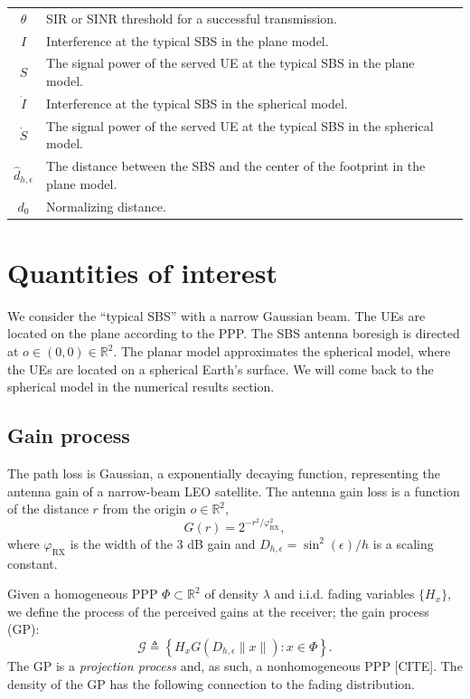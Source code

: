 \documentclass[lettersize,journal]{IEEEtran}
\newcommand{\R}{\mathbb{R}}
\begin{document}
\begin{table}
\begin{center}
\begin{tabular}{| c | p{4.5cm}  |p{1.5cm}|}
      $\theta$ & SIR or SINR threshold for a successful transmission.&\\
      $I$ & Interference at the typical SBS in the plane model.&\\
      $S$ & The signal power of the served UE at the typical SBS in the plane model.&\\
      $\mathring{I}$ & Interference at the typical SBS in the spherical model.&\\
      $\mathring{S}$ & The signal power of the served UE at the typical SBS in the spherical model.&\\ 
      $\hat{d}_{h,\epsilon}$ & The distance between the SBS and the center of the footprint in the plane model.&\\
      $d_{0}$ & Normalizing distance. & \\                        
      \hline
    \end{tabular}
  \end{center}
\end{table}   


\section{Quantities of interest}
We consider the ``typical SBS'' with a narrow Gaussian beam. The UEs are located on the plane according to the PPP. The SBS antenna boresigh is directed at $\textit{o} \in (0,0) \in \R^2$. The planar model approximates the spherical model, where the UEs are located on a spherical Earth's surface. We will come back to the spherical model in the numerical results section.



\subsection{Gain process}
The path loss is Gaussian, a exponentially decaying function, representing the antenna gain of a narrow-beam LEO satellite. The antenna gain loss is a function of the distance $r$ from the origin $\textit{o}\in \R^2$, 
\begin{equation}
  G(r) = 2^{-r^2/\varphi^2_{\text{RX}}},
\end{equation}
where $\varphi_{\text{RX}}$ is the width of the $3$ dB gain and $D_{h,\epsilon}=\sin^2(\epsilon)/h$ is a scaling constant. 

Given a homogeneous PPP $\Phi \subset \R^2$ of density $\lambda$ and i.i.d. fading variables $\{H_x\}$, we define the process of the perceived gains at the receiver; the gain process (GP):
\begin{equation}
  \label{eq:gainprocess}
  \mathcal{G} \triangleq \left\{ H_x G(D_{h,\epsilon}\|x\|):x \in \Phi  \right\}.
\end{equation}
The GP is a \textit{projection process} and, as such, a nonhomogeneous PPP [CITE]. The density of the GP has the following connection to the fading distribution.
\end{document}
